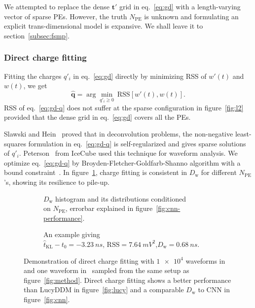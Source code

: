 We attempted to replace the dense $\bm{t'}$ grid in eq.~\eqref{eq:gd} with a length-varying vector of sparse PEs. However, the truth $N_\mathrm{PE}$ is unknown and formulating an explicit trans-dimensional model is expansive.  We shall leave it to section~\ref{subsec:fsmp}.

\subsubsection{Direct charge fitting}
\label{sec:dcf}

Fitting the charges $q'_i$ in eq.~\eqref{eq:gd} directly by minimizing RSS of $w'(t)$ and $w(t)$, we get
\begin{equation}
  \label{eq:gd-q}
  \bm{\hat{q}} = \arg \underset{q'_i \ge 0}{\min}~\mathrm{RSS}\left[w'(t),w(t)\right].
\end{equation}
RSS of eq.~\eqref{eq:gd-q} does not suffer at the sparse configuration in figure~\ref{fig:l2} provided that the dense grid in eq.~\eqref{eq:gd} covers all the PEs.

Slawski and Hein~\cite{slawski_non-negative_2013} proved that in deconvolution problems, the non-negative least-squares formulation in eq.~\eqref{eq:gd-q} is self-regularized and gives sparse solutions of $q'_i$.  Peterson~\cite{peterson_developments_2021} from IceCube used this technique for waveform analysis.  We optimize eq.~\eqref{eq:gd-q} by Broyden-Fletcher-\allowbreak{}Goldfarb-Shanno algorithm with a bound constraint~\cite{byrd_limited_1995}.  In figure~\ref{fig:fitting-npe}, charge fitting is consistent in $D_\mathrm{w}$ for different $N_\mathrm{PE}$'s, showing its resilience to pile-up.

\begin{figure}[H]
  \begin{subfigure}{.5\textwidth}
    \centering
    \resizebox{\textwidth}{!}{}
    \caption{\label{fig:fitting-npe} $D_\mathrm{w}$ histogram and its distributions conditioned \\ on $N_{\mathrm{PE}}$, errorbar explained in figure~\ref{fig:cnn-performance}.}
  \end{subfigure}
  \begin{subfigure}{.5\textwidth}
    \centering
    \resizebox{\textwidth}{!}{}
    \caption{\label{fig:fitting}An example giving \\ $\hat{t}_\mathrm{KL} - t_0=\SI{-3.23}{ns}$, $\mathrm{RSS}=\SI{7.64}{mV^2}$,$D_\mathrm{w}=\SI{0.68}{ns}$.}
  \end{subfigure}
  \caption{\label{fig:dcf}Demonstration of direct charge fitting with $\num[retain-unity-mantissa=false]{1e4}$ waveforms in~ and one waveform in~ sampled from the same setup as figure~\ref{fig:method}.  Direct charge fitting shows a better performance than LucyDDM in figure~\ref{fig:lucy} and a comparable $D_\mathrm{w}$ to CNN in figure~\ref{fig:cnn}.}
\end{figure}

